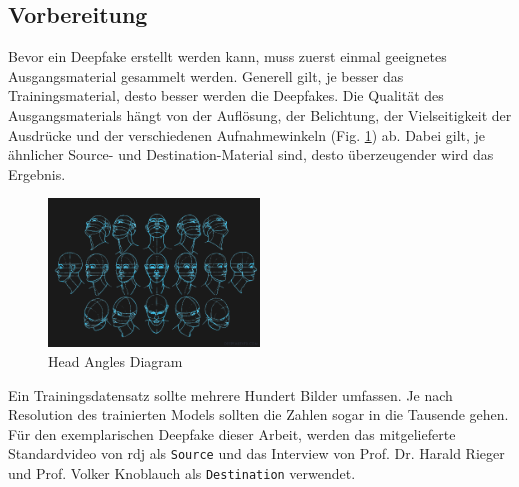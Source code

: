 \subsection{Vorbereitung}\label{subsec:vorbereitung}
Bevor ein Deepfake erstellt werden kann, muss zuerst einmal geeignetes Ausgangsmaterial gesammelt werden.
Generell gilt, je besser das Trainingsmaterial, desto besser werden die Deepfakes.
Die Qualität des Ausgangsmaterials hängt von der Auflösung, der Belichtung, der Vielseitigkeit der Ausdrücke und der verschiedenen Aufnahmewinkeln (Fig. \ref{fig:head-angles-diagram}) ab.
Dabei gilt, je ähnlicher Source- und Destination-Material sind, desto überzeugender wird das Ergebnis.
\begin{figure}
    \center
    \includegraphics[width=0.5\textwidth]{Bilder/DFL/Human_Head_Angles_Diagram}
    \caption{Head Angles Diagram}
    \label{fig:head-angles-diagram}
\end{figure}

Ein Trainingsdatensatz sollte mehrere Hundert Bilder umfassen.
Je nach Resolution des trainierten Models sollten die Zahlen sogar in die Tausende gehen.\\[0.5cm]

Für den exemplarischen Deepfake dieser Arbeit, werden das mitgelieferte Standardvideo von \gls{rdj} als \texttt{Source} und das Interview von Prof. Dr. Harald Rieger und Prof. Volker Knoblauch als \texttt{Destination} verwendet.


